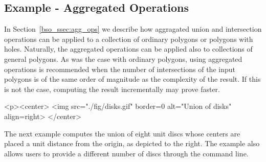 \subsection{Example - Aggregated Operations\label{bso_ssec:aggregated_gen_ops}}

In Section~\ref{bso_ssec:agg_ops} we describe how aggragated union
and intersection operations can be applied to a collection of ordinary
polygons or polygons with holes. Naturally, the aggregated operations
can be applied also to collections of general polygons. As was the
case with ordinary polygons, using aggregated operations is
recommended when the number of intersections of the input polygons
is of the same order of magnitude as the complexity of the result. If
this is not the case, computing the result incrementally may prove
faster.

\lcTex{%
  \setlength{\BooleanSetOpsWidthRight}{3.4cm}
  \setlength{\BooleanSetOpsWidthLeft}{\BooleanSetOpsWidthLineReal}
  \addtolength{\BooleanSetOpsWidthLeft}{-\BooleanSetOpsWidthRight}
  \begin{minipage}{\BooleanSetOpsWidthLeft}
}
\label{fig:disks}
\begin{ccHtmlOnly}
  <p><center>
    <img src="./fig/disks.gif" border=0 alt="Union of disks" align=right>
  </center>
\end{ccHtmlOnly}
The next example computes the union of eight unit discs whose centers are
placed a unit distance from the origin, as depicted to the right. The example
also allows users to provide a different number of discs through the command
line.

